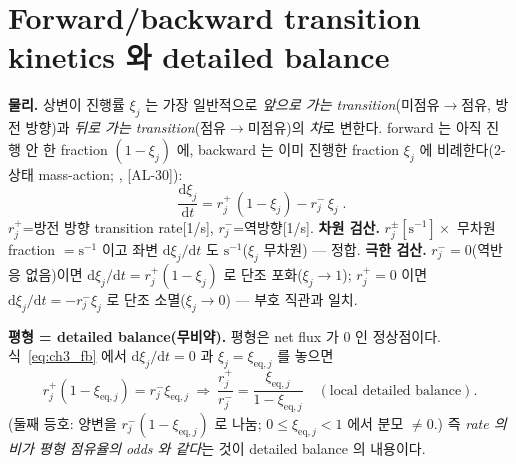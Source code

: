 \documentclass[11pt,a4paper]{article}
\newcommand{\dd}{\mathrm{d}}
\newcommand{\eq}{\mathrm{eq}}
\newcommand{\AL}[1]{\textsf{[AL-#1]}}
\begin{document}
\section{Forward/backward transition kinetics 와 detailed balance}\label{sec:ch3_db}
\textbf{물리.} 상변이 진행률 $\xi_j$ 는 가장 일반적으로 \emph{앞으로 가는 transition}(미점유$\to$점유, 방전
방향)과 \emph{뒤로 가는 transition}(점유$\to$미점유)의 \emph{차}로 변한다. forward 는 아직 진행 안 한 fraction
$(1-\xi_j)$ 에, backward 는 이미 진행한 fraction $\xi_j$ 에 비례한다(2-상태 mass-action; \cite{eyring1935,degrootmazur1962,onsager1931},
\AL{30}):
\begin{equation}
\boxed{\;\frac{\dd\xi_j}{\dd t}=r_j^+\,(1-\xi_j)-r_j^-\,\xi_j\;.}
\label{eq:ch3_fb}
\end{equation}
$r_j^+$=방전 방향 transition rate[1/s], $r_j^-$=역방향[1/s]. \textbf{차원 검산.} $r_j^\pm[\mathrm{s^{-1}}]\times$
무차원 fraction $=\mathrm{s^{-1}}$ 이고 좌변 $\dd\xi_j/\dd t$ 도 $\mathrm{s^{-1}}$($\xi_j$ 무차원) — 정합.
\textbf{극한 검산.} $r_j^-=0$(역반응 없음)이면 $\dd\xi_j/\dd t=r_j^+(1-\xi_j)$ 로 단조 포화($\xi_j\to1$);
$r_j^+=0$ 이면 $\dd\xi_j/\dd t=-r_j^-\xi_j$ 로 단조 소멸($\xi_j\to0$) — 부호 직관과 일치.

\textbf{평형 = detailed balance(무비약).} 평형은 net flux 가 $0$ 인 정상점이다. 식~\eqref{eq:ch3_fb} 에서
$\dd\xi_j/\dd t=0$ 과 $\xi_j=\xi_{\eq,j}$ 를 놓으면
\begin{equation}
r_j^+(1-\xi_{\eq,j})=r_j^-\xi_{\eq,j}
\ \Longrightarrow\
\frac{r_j^+}{r_j^-}=\frac{\xi_{\eq,j}}{1-\xi_{\eq,j}}\quad(\text{local detailed balance}).
\label{eq:ch3_db}
\end{equation}
(둘째 등호: 양변을 $r_j^-(1-\xi_{\eq,j})$ 로 나눔; $0\le\xi_{\eq,j}<1$ 에서 분모 $\ne0$.) 즉 \emph{rate 의 비가
평형 점유율의 odds 와 같다}는 것이 detailed balance 의 내용이다.
\end{document}
